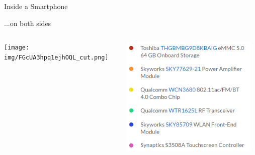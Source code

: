 \documentclass[aspectratio=169]{beamer}
\begin{document}
	\begin{frame}{Inside a Smartphone}
		\begin{flushleft}...on both sides\end{flushleft}
		\begin{columns}
		\begin{column}{0.55\textwidth}	
		\centering
		\texttt{[image: img/FGcUA3hpq1ejhOQL\_cut.png]}	
		\end{column}
		\begin{column}{0.45\textwidth}
		\centering		
		\includegraphics[width=0.95\textwidth,height=0.75\textheight,keepaspectratio]{img/oneplus_2.png}
		\end{column}
		\end{columns}
	\end{frame}  
\end{document}
